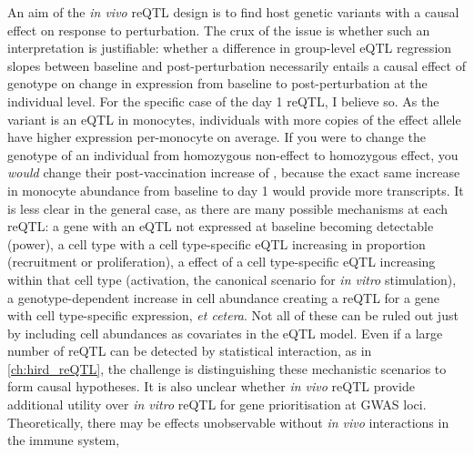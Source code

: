 An aim of the \textit{in vivo} \gls{reQTL} design is to find host genetic variants with a causal effect on response to perturbation.
The crux of the issue is whether such an interpretation is justifiable: whether a difference in group-level \gls{eQTL} regression slopes between baseline and post-perturbation
necessarily entails a causal effect of genotype on change in expression from baseline to post-perturbation at the individual level.
For the specific case of the  day 1 \gls{reQTL}, I believe so.
As the variant is an \gls{eQTL} in monocytes,
individuals with more copies of the effect allele have higher  expression per-monocyte on average.
If you were to change the genotype of an individual from homozygous non-effect to homozygous effect,
you \textit{would} change their post-vaccination increase of ,
because the exact same increase in monocyte abundance from baseline to day 1
would provide more  transcripts.
It is less clear in the general case, as there are many possible mechanisms at each \gls{reQTL}:
a gene with an \gls{eQTL} not expressed at baseline becoming detectable (power),
a cell type with a cell type-specific \gls{eQTL} increasing in proportion (recruitment or proliferation),
a effect of a cell type-specific \gls{eQTL} increasing within that cell type (activation, the canonical scenario for \textit{in vitro} stimulation),
a genotype-dependent increase in cell abundance creating a \gls{reQTL} for a gene with cell type-specific expression,
\textit{et cetera}.
Not all of these can be ruled out just by including cell abundances as covariates in the \gls{eQTL} model.
Even if a large number of \gls{reQTL} can be detected by statistical interaction, as in \cref{ch:hird_reQTL},
the challenge is distinguishing these mechanistic scenarios to form causal hypotheses.
It is also unclear whether \textit{in vivo} \gls{reQTL} provide additional utility over \textit{in vitro} \gls{reQTL} for gene prioritisation at \gls{GWAS} loci.
Theoretically, there may be effects unobservable without \textit{in vivo} interactions in the immune system, 
